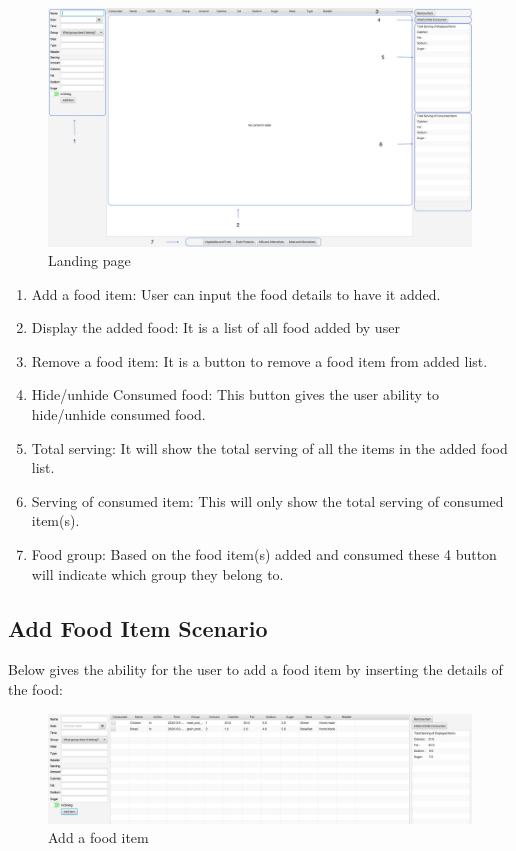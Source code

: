 \documentclass{scrreprt}
\begin{document}
\begin{figure}[!htbp]
\centering
\includegraphics[width=15cm]{pictures/raw.png}
\caption{Landing page}
\end{figure}
\FloatBarrier
\begin{enumerate}
\item Add a food item: User can input the food details to have it added.
\item Display the added food: It is a list of all food added by user
\item Remove a food item: It is a button to remove a food item from added list.
\item Hide/unhide Consumed food: This button gives the user ability to hide/unhide consumed food.
\item Total serving: It will show the total serving of all the items in the added food list.
\item Serving of consumed item: This will only show the total serving of consumed item(s).
\item Food group: Based on the food item(s) added and consumed these 4 button will indicate which group they belong to.
\end{enumerate}
	
\subsection{Add Food Item Scenario}

Below gives the ability for the user to add a food item by inserting the details of the food:

\begin{figure}[!htbp]
\centering
\includegraphics[width=15cm]{pictures/add-food-item.png}
\caption{Add a food item}
\end{figure}
\end{document}
